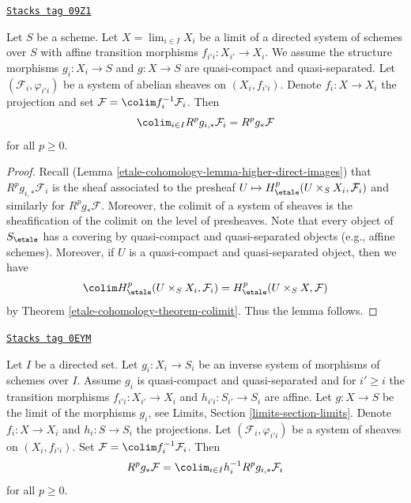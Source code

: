 \begin{lemma}
\label{etale-cohomology-lemma-relative-colimit}
\href{https://stacks.math.columbia.edu/tag/09Z1}{\texttt{Stacks tag 09Z1}}

Let $S$ be a scheme. Let $X = \lim_{i \in I} X_i$ be a limit of a
directed system of schemes over $S$ with affine transition morphisms
$f_{i'i} : X_{i'} \to X_i$. We assume the structure morphisms
$g_i : X_i \to S$ and $g : X \to S$ are quasi-compact and quasi-separated.
Let $(\mathcal{F}_i, \varphi_{i'i})$ be a system of abelian sheaves
on $(X_i, f_{i'i})$. Denote $f_i : X \to X_i$ the projection and set
$\mathcal{F} = \colim f_i^{-1}\mathcal{F}_i$. Then
$$
\colim_{i\in I} R^p g_{i, *} \mathcal{F}_i = R^p g_* \mathcal{F}
$$
for all $p \geq 0$.
\end{lemma}

\begin{proof}
Recall (Lemma \ref{etale-cohomology-lemma-higher-direct-images})
that $R^p g_{i, *} \mathcal{F}_i$ is the sheaf associated to the
presheaf $U \mapsto H^p_\etale(U \times_S X_i, \mathcal{F}_i)$
and similarly for $R^pg_*\mathcal{F}$. Moreover, the colimit of a
system of sheaves is the sheafification of the colimit on the level
of presheaves. Note that every object of $S_\etale$ has a covering
by quasi-compact and quasi-separated objects (e.g., affine schemes).
Moreover, if $U$ is a quasi-compact and quasi-separated object,
then we have
$$
\colim H^p_\etale(U \times_S X_i, \mathcal{F}_i) =
H^p_\etale(U \times_S X, \mathcal{F})
$$
by Theorem \ref{etale-cohomology-theorem-colimit}. Thus the lemma follows.
\end{proof}

\begin{lemma}
\label{etale-cohomology-lemma-relative-colimit-general}
\href{https://stacks.math.columbia.edu/tag/0EYM}{\texttt{Stacks tag 0EYM}}

Let $I$ be a directed set. Let $g_i : X_i \to S_i$ be an inverse system of
morphisms of schemes over $I$. Assume $g_i$ is quasi-compact and
quasi-separated and for $i' \geq i$ the transition morphisms
$f_{i'i} : X_{i'} \to X_i$ and $h_{i'i} : S_{i'} \to S_i$ are affine.
Let $g : X \to S$ be the limit of the morphisms $g_i$, see
Limits, Section \ref{limits-section-limits}.
Denote $f_i : X \to X_i$ and $h_i : S \to S_i$ the projections.
Let $(\mathcal{F}_i, \varphi_{i'i})$ be a system of sheaves
on $(X_i, f_{i'i})$. Set $\mathcal{F} = \colim f_i^{-1}\mathcal{F}_i$. Then
$$
R^p g_* \mathcal{F} =
\colim_{i \in I} h_i^{-1}R^p g_{i, *} \mathcal{F}_i
$$
for all $p \geq 0$.
\end{lemma}

